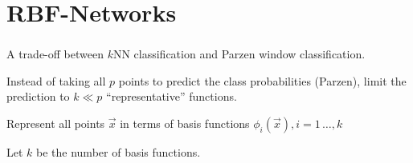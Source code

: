 

\section{RBF-Networks}


\begin{frame}\frametitle{\secname}

A trade-off between $k$NN classification and Parzen window classification.

Instead of taking all $p$ points to predict the class probabilities (Parzen), limit the prediction to $k \ll p$  ``representative'' functions.

Represent all points $\vec x$ in terms of basis functions $\phi_i(\vec x), i=1\,\ldots,k$

Let $k$ be the number of basis functions.

\end{frame}

